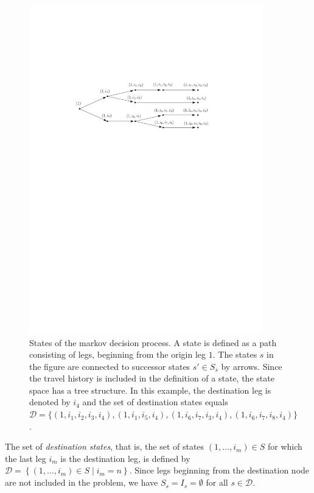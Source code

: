 \documentclass[dissertation,draft*]{aaltoseries}
\begin{document}
\begin{figure}[ht]
\begin{center}
\includegraphics[width=0.9\textwidth]{treemodel01}
\end{center}
\caption{
States of the markov decision process. A state is defined as a path consisting of legs, beginning from the origin leg $1$.
The states $s$ in the figure are connected to successor states $s' \in S_s$ by arrows.
Since the travel history is included in the definition of a state, the state space has a tree structure.
In this example, the destination leg is denoted by $i_4$  and the set of destination states equals
$\mathcal{D} = \{(1,i_1,i_2,i_3,i_4),(1,i_1,i_5,i_4),(1,i_6,i_7,i_3,i_4),(1,i_6,i_7,i_8,i_4)\}$.
}
\label{treemodel01}
\end{figure}

The set of \emph{destination states}, that is, the set of states $(1,\ldots,i_m) \in S$ for which the last leg $i_m$ 
is the destination leg, is defined by $\mathcal{D} = \left\{(1,\ldots,i_m) \in S \mid i_m=n  \right\}$.
Since legs beginning from the destination node are not included in the problem, we have $S_s = I_s = \emptyset$ for all $s \in \mathcal{D}$.
\end{document}
